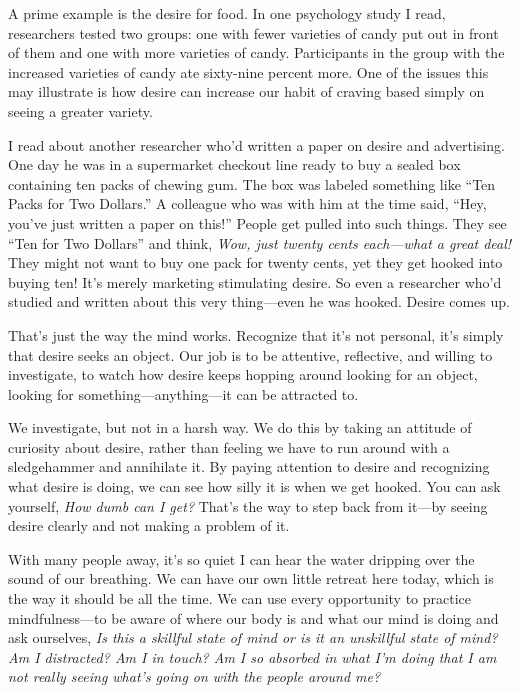 A prime example is the desire for food. In one psychology study I read, 
researchers tested two groups: one with fewer varieties of candy put 
out in front of them and one with more varieties of candy. Participants 
in the group with the increased varieties of candy ate sixty-nine 
percent more. One of the issues this may illustrate is how desire can 
increase our habit of craving based simply on seeing a greater variety.

I read about another researcher who'd written a paper on desire and 
advertising. One day he was in a supermarket checkout line ready to buy 
a sealed box containing ten packs of chewing gum. The box was labeled 
something like ``Ten Packs for Two Dollars.'' A colleague who was with 
him at the time said, ``Hey, you've just written a paper on this!'' 
People get pulled into such things. They see ``Ten for Two Dollars'' 
and think, \emph{Wow, just twenty cents each---what a great deal!} They 
might not want to buy one pack for twenty cents, yet they get hooked 
into buying ten! It's merely marketing stimulating desire. So even a 
researcher who'd studied and written about this very thing---even he 
was hooked. Desire comes up.

That's just the way the mind works. Recognize that it's not personal, 
it's simply that desire seeks an object. Our job is to be attentive, 
reflective, and willing to investigate, to watch how desire keeps 
hopping around looking for an object, looking for 
something---anything---it can be attracted to.

We investigate, but not in a harsh way. We do this by taking an 
attitude of curiosity about desire, rather than feeling we have to run 
around with a sledgehammer and annihilate it. By paying attention to 
desire and recognizing what desire is doing, we can see how silly it is 
when we get hooked. You can ask yourself, \emph{How dumb can I get?} 
That's the way to step back from it---by seeing desire clearly and not 
making a problem of it.


With many people away, it's so quiet I can hear the water dripping over 
the sound of our breathing. We can have our own little retreat here 
today, which is the way it should be all the time. We can use every 
opportunity to practice mindfulness---to be aware of where our body is 
and what our mind is doing and ask ourselves, \emph{Is this a skillful 
state of mind or is it an unskillful state of mind? Am I distracted? Am 
I in touch? Am I so absorbed in what I'm doing that I am not really 
seeing what's going on with the people around me?}

